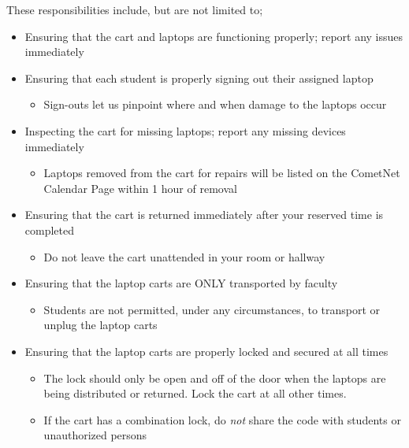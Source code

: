 \begin{titlepage}
\small
These responsibilities include, but are not limited to;
\begin{itemize}
\item Ensuring that the cart and laptops are functioning properly; report any issues immediately
\item Ensuring that each student is properly signing out their assigned laptop
\begin{itemize}
\item Sign-outs let us pinpoint where and when damage to the laptops occur
\end{itemize}
\item Inspecting the cart for missing laptops; report any missing devices immediately
\begin{itemize}
\item Laptops removed from the cart for repairs will be listed on the CometNet Calendar Page within 1 hour of removal
\end{itemize}
\item Ensuring that the cart is returned immediately after your reserved time is completed
\begin{itemize}
\item Do not leave the cart unattended in your room or hallway
\end{itemize}
\item Ensuring that the laptop carts are ONLY transported by faculty
\begin{itemize}
\item Students are not permitted, under any circumstances, to transport or unplug the laptop carts
\end{itemize}
\item Ensuring that the laptop carts are properly locked and secured at all times
\begin{itemize}
\item The lock should only be open and off of the door when the laptops are being distributed or returned. Lock the cart at all other times.
\item If the cart has a combination lock, do \emph{not} share the code with students or unauthorized persons
\end{itemize}
\end{itemize}
\end{titlepage}
